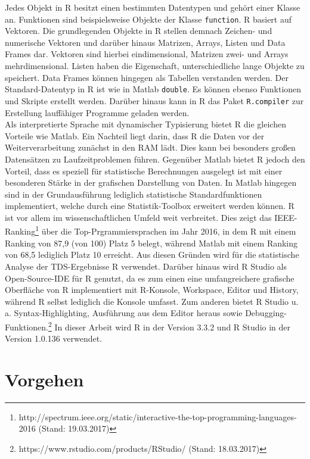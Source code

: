 Jedes Objekt in R besitzt einen bestimmten Datentypen und gehört einer Klasse an. Funktionen sind beispielsweise Objekte der Klasse \texttt{function}. R basiert auf Vektoren. Die grundlegenden Objekte in R stellen demnach Zeichen- und numerische Vektoren und darüber hinaus Matrizen, Arrays, Listen und Data Frames dar. Vektoren sind hierbei eindimensional, Matrizen zwei- und Arrays mehrdimensional. Listen haben die Eigenschaft, unterschiedliche lange Objekte zu speichert. Data Frames können hingegen als Tabellen verstanden werden. Der Standard-Datentyp in R ist wie in Matlab \texttt{double}. Es können ebenso Funktionen und Skripte erstellt werden. Darüber hinaus kann in R das Paket \texttt{R.compiler} zur Erstellung lauffähiger Programme geladen werden. \parencite{adler_r_2012, manderscheid_sozialwissenschaftliche_2012}\\

Als interpretierte Sprache mit dynamischer Typisierung bietet R die gleichen Vorteile wie Matlab. Ein Nachteil liegt darin, dass R die Daten vor der Weiterverarbeitung zunächst in den RAM lädt. Dies kann bei besonders großen Datensätzen zu Laufzeitproblemen führen. Gegenüber Matlab bietet R jedoch den Vorteil, dass es speziell für statistische Berechnungen ausgelegt ist mit einer besonderen Stärke in der grafischen Darstellung von Daten. In Matlab hingegen sind in der Grundausführung lediglich statistische Standardfunktionen implementiert, welche durch eine Statistik-Toolbox erweitert werden können. R ist vor allem im wissenschaftlichen Umfeld weit verbreitet. Dies zeigt das IEEE-Ranking\footnote{http://spectrum.ieee.org/static/interactive-the-top-programming-languages-2016 (Stand: 19.03.2017)} über die Top-Prgrammiersprachen im Jahr 2016, in dem R mit einem Ranking von 87,9 (von 100) Platz 5 belegt, während Matlab mit einem Ranking von 68,5 lediglich Platz 10 erreicht. Aus diesen Gründen wird für die statistische Analyse der \acs{TDS}-Ergebnisse R verwendet. Darüber hinaus wird R Studio als Open-Source-IDE für R genutzt, da es zum einen eine umfangreichere grafische Oberfläche von R implementiert mit R-Konsole, Workspace, Editor und History, während R selbst lediglich die Konsole umfasst. Zum anderen bietet R Studio u. a. Syntax-Highlighting, Ausführung aus dem Editor heraus sowie Debugging-Funktionen.\footnote{https://www.rstudio.com/products/RStudio/ (Stand: 18.03.2017)} In dieser Arbeit wird R in der Version 3.3.2 und R Studio in der Version 1.0.136 verwendet.

\section{Vorgehen}

